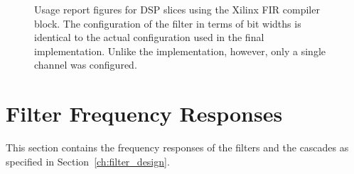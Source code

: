 \begin{figure}
    \centering
    
    \caption[Usage Report FIR Compiler]{%
        Usage  report figures  for DSP  slices using  the Xilinx  FIR compiler
        block. The  configuration  of  the  filter in  terms  of  bit  widths
        is  identical   to  the  actual   configuration  used  in   the  final
        implementation. Unlike  the  implementation,  however, only  a  single
        channel was configured.%
    }
    \label{fig:usage_report}
\end{figure}

%
%
\section{Filter Frequency Responses} %
\label{sec:filter_frequency_responses}

This section contains the frequency responses  of the filters and the cascades
as specified in Section~\ref{ch:filter_design}.
%
%
\subsection{} %
\label{sec:filter_frequency_responses:5steep}

%
%
\subsection{} %
\label{sec:filter_frequency_responses:5flat}

%
%
